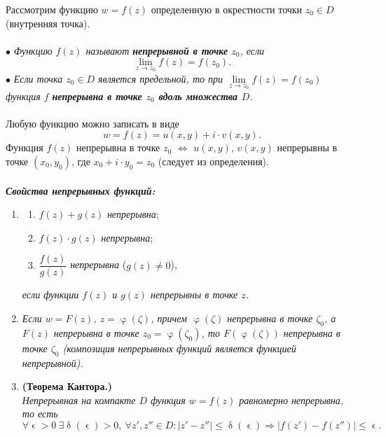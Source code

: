 \documentclass[a4paper, 12pt]{article}
\renewcommand{\leq}{\leqslant}
\renewcommand{\delta}{\updelta}
\renewcommand{\varphi}{\upvarphi}
\renewcommand{\epsilon}{\upvarepsilon}
\newcommand{\limdef}{\forall \epsilon >0\ \exists \delta (\epsilon) > 0}
\begin{document}
Рассмотрим функцию $w = f(z)$ определенную в окрестности точки $z_0\in D$ (внутренняя точка). \\\\
$\bullet$ \textit{Функцию $f(z)$ называют \textbf{непрерывной в точке} $z_0$, если} $$\lim\limits_{z\to z_0} f(z) = f(z_0).$$
$\bullet$ \textit{Если точка $z_0 \in D$ является предельной, то при $\lim\limits_{z\to z_0} f(z) = f(z_0)$ функция $f$ \textbf{непрерывна в точке $z_0$ вдоль множества $D$}.}\\\\
Любую функцию можно записать в виде $$w = f(z) = u(x,y) + i\cdot v(x,y).$$
Функция $f(z)$ непрерывна в точке $z_0$ $\Longleftrightarrow$ $u(x,y)$, $v(x,y)$ непрерывны в точке $(x_0,y_0)$, где $x_0 + i\cdot y_0 = z_0$ (следует из определения).\\\\
\textbf{\textit{Свойства непрерывных функций:}}\begin{enumerate}
	\item \begin{enumerate}
		\item $f(z) + g(z)$ \textit{непрерывна};
		\item $f(z)\cdot g(z)$ \textit{непрерывна};
		\item $\dfrac{f(z)}{g(z)}$ \textit{непрерывна} ($g(z)\ne 0$),
	\end{enumerate}
	\textit{если функции $f(z)$ и $g(z)$ непрерывны в точке $z$.}
	\item \textit{Если $w = F(z)$, $z = \varphi(\zeta)$, причем $\varphi(\zeta)$ непрерывна в точке $\zeta_0$, а $F(z)$ непрерывна в точке $z_0 = \varphi(\zeta_0)$, то $F(\varphi(\zeta))$ непрерывна в точке $\zeta_0$ (композиция непрерывных функций является функцией непрерывной).}
	\item \textbf{(Теорема Кантора.)}\\
	\textit{Непрерывная на компакте $D$ функция $w = f(z)$ равномерно непрерывна, то есть }$$\limdef,\ \forall z',z'' \in D : |z' - z''|\leq\delta(\epsilon)\Rightarrow |f(z') - f(z'')|\leq \epsilon.$$
\end{enumerate}
\end{document}
